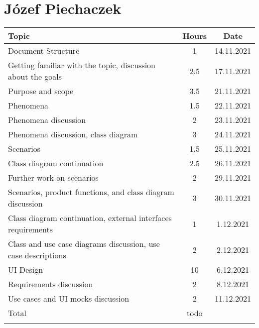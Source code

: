 \section*{Józef Piechaczek}
\begin{table}[H]
    \centering
    \begin{tabular}{lcc} \Xhline{1.5pt}
        Topic &  Hours & Date \\ \hline
        Document Structure & 1 & 14.11.2021 \\ 
        Getting familiar with the topic, discussion about the goals & 2.5 & 17.11.2021 \\ 
        Purpose and scope & 3.5 & 21.11.2021 \\ 
        Phenomena & 1.5 & 22.11.2021 \\ 
        Phenomena discussion & 2 & 23.11.2021 \\
        Phenomena discussion, class diagram & 3 & 24.11.2021 \\ 
        Scenarios & 1.5 & 25.11.2021 \\
        Class diagram continuation & 2.5 & 26.11.2021 \\ 
        Further work on scenarios & 2 & 29.11.2021 \\
        Scenarios, product functions, and class diagram discussion & 3 & 30.11.2021\\ 
        Class diagram continuation, external interfaces requirements & 1 & 1.12.2021\\
        Class and use case diagrams discussion, use case descriptions & 2 & 2.12.2021\\
        UI Design & 10 & 6.12.2021\\ 
        Requirements discussion & 2 & 8.12.2021\\
        Use cases and UI mocks discussion & 2 & 11.12.2021\\
        \hline
        Total &  todo & \\ \Xhline{1.5pt}
    \end{tabular}
\end{table}

